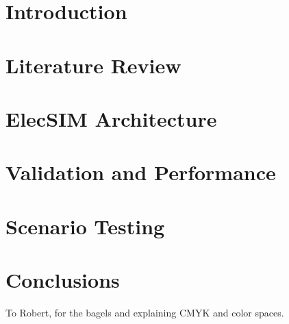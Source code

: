 \documentclass[sigconf]{acmart}
\begin{document}
%

%
\maketitle


\section{Introduction}


\section{Literature Review}\label{Literature Review}

\section{ElecSIM Architecture} \label{Model}


\section{Validation and Performance}\label{Valdiation and Performance}


\section{Scenario Testing}\label{Scenario Testing}




\section{Conclusions}\label{Conclusion}





%
\begin{acks}
To Robert, for the bagels and explaining CMYK and color spaces.
\end{acks}
\end{document}
